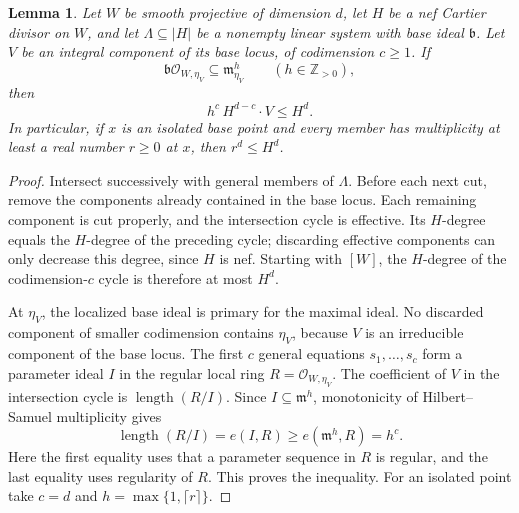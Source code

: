 \documentclass[12pt,a4paper,psamsfonts]{amsart}
\theoremstyle{definition}
\theoremstyle{plain}
\newtheorem{lemma}{Lemma}[section]
\newcommand{\OO}{\mathcal O}
\begin{document}
\begin{lemma}\label{lem:hd-base-degree}
Let $W$ be smooth projective of dimension $d$, let $H$ be a nef
Cartier divisor on $W$, and let
$\Lambda\subseteq|H|$ be a nonempty linear system
with base ideal $\mathfrak b$. Let $V$ be an integral component of
its base locus, of codimension $c\ge1$. If
\[
 \mathfrak b\OO_{W,\eta_V}\subseteq
 \mathfrak m_{\eta_V}^{h}\qquad(h\in\mathbb Z_{>0}),
\]
then
\[
 h^c\,H^{d-c}\cdot V\le H^d.
\]
In particular, if $x$ is an isolated base point and every member
has multiplicity at least a real number $r\ge0$ at $x$, then
$r^d\le H^d$.
\end{lemma}
\begin{proof}
Intersect successively with general members of $\Lambda$.
Before each next cut, remove the components already contained in
the base locus. Each remaining component is cut properly, and the
intersection cycle is effective. Its $H$-degree equals the $H$-degree
of the preceding cycle; discarding effective components can only
decrease this degree, since $H$ is nef. Starting with $[W]$, the
$H$-degree of the codimension-$c$ cycle is therefore at most $H^d$.

At $\eta_V$, the localized base ideal is primary for the maximal
ideal. No discarded component of smaller codimension contains
$\eta_V$, because $V$ is an irreducible component of the base locus.
The first $c$ general equations $s_1,\ldots,s_c$ form a parameter
ideal $I$ in the regular local ring $R=\OO_{W,\eta_V}$.
The coefficient of $V$ in the intersection cycle is
$\operatorname{length}(R/I)$. Since $I\subseteq\mathfrak m^h$,
monotonicity of Hilbert--Samuel multiplicity gives
\[
 \operatorname{length}(R/I)=e(I,R)
 \ge e(\mathfrak m^h,R)=h^c.
\]
Here the first equality uses that a parameter sequence in $R$ is
regular, and the last equality uses regularity of $R$.
This proves the inequality. For an isolated point take $c=d$ and
$h=\max\{1,\lceil r\rceil\}$.
\end{proof}
\end{document}
